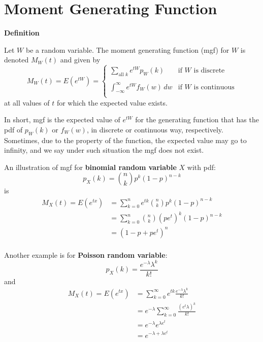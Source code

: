 \documentclass[11pt]{article}
\begin{document}
\section {\large Moment Generating Function}

\begin{tcolorbox}[
	enhanced, 
	width=\textwidth, 
	fontupper=\normalsize,%
	drop fuzzy shadow southwest,
	boxrule=0.4pt,
	sharp corners,
	colframe=yellow!80!black,
	colback=yellow!10]
	
\textbf{\color{RoyalBlue} Definition} 

\qquad Let $W$ be a random variable.  The moment generating function (mgf) for $W$ is denoted $M_W (t)$ and given by
\[ 
M_W (t) = E(e^{tW}) =  \left\{
\begin{array}{ll}
    \displaystyle  \sum _{ \text{all $k$} } e^{tW} p_W(k)  & \text{if $W$ is discrete} \\
    \hspace{5pt} \\
    \displaystyle \int _{-\infty} ^{\infty} e^{tW} f_W (w) \, dw  & \text{if $W$ is continuous} \\
\end{array} 
\right. 
\]
at all values of $t$ for which the expected value exists.

\end{tcolorbox}


In short, mgf is the expected value of $e^{tW}$ for the generating function that has the pdf of $p_W(k)$ or $f_W (w)$,  in discrete or continuous way,  respectively.   Sometimes, due to the property of the function,  the expected value may go to infinity,  and we say under such situation the mgf does not exist.

An illustration of mgf for \textbf {binomial random variable} $X$ with pdf:
$$
p_X (k) = \binom{n}{k} p^k (1-p)^{n-k}
$$
is
$$
\begin{aligned}
M_X (t) = E(e^{tx})
	&= \sum ^n _{k=0} e^{tk} \binom{n}{k} p^k (1-p)^{n-k} \\
	&= \sum ^n _{k=0} \binom{n}{k} (pe^t)^k (1-p)^{n-k} \\
	&= (1-p + pe^t) ^n \\
\end{aligned}
$$

Another example is for \textbf {Poisson random variable}:
$$
p_X (k) = \frac{e^{-\lambda} \lambda ^k}{k!}
$$
and
$$
\begin{aligned}
M_X(t) = E(e^{tx})
	&= \sum _{k=0} ^ \infty e^{tk} \frac {e^{-\lambda} \lambda ^k} {k!} \\
	&= e^{-\lambda} \sum _{k=0} ^ \infty \frac{ (e^t \lambda)^k} {k!}\\
	&= e^{-\lambda} e^{\lambda e^t} \\
	&= e^{-\lambda + \lambda e^t} \\
\end{aligned}
$$
\end{document}
